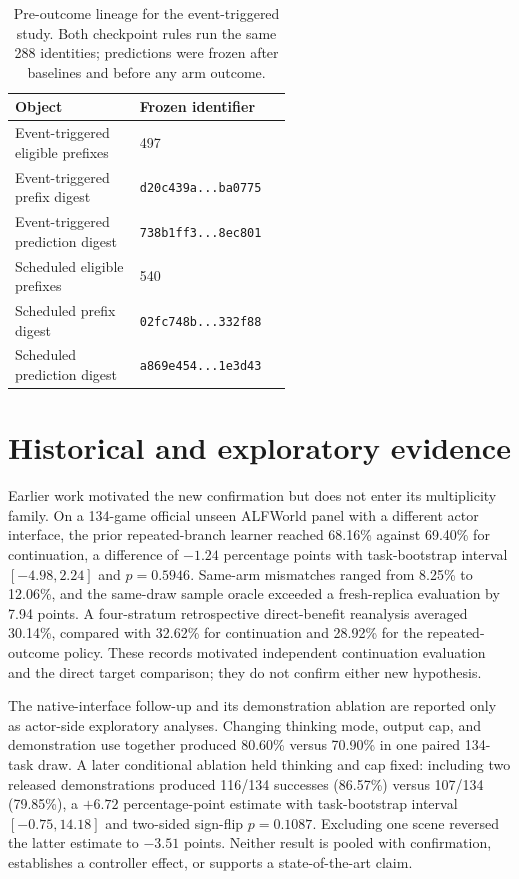 \begin{table}[ht]
\caption{Pre-outcome lineage for the event-triggered study. Both checkpoint rules run the same 288 identities; predictions were frozen after baselines and before any arm outcome.}
\label{tab:r2-lineage}
\centering
\small
\begin{tabular}{@{}lp{0.55\linewidth}@{}}
\toprule
Object & Frozen identifier \\
\midrule
Event-triggered eligible prefixes & 497 \\
Event-triggered prefix digest & \texttt{d20c439a...ba0775} \\
Event-triggered prediction digest & \texttt{738b1ff3...8ec801} \\
Scheduled eligible prefixes & 540 \\
Scheduled prefix digest & \texttt{02fc748b...332f88} \\
Scheduled prediction digest & \texttt{a869e454...1e3d43} \\
\bottomrule
\end{tabular}
\end{table}


\section{Historical and exploratory evidence}
\label{app:historical}

Earlier work motivated the new confirmation but does not enter its multiplicity family. On a 134-game official unseen ALFWorld panel with a different actor interface, the prior repeated-branch learner reached 68.16\% against 69.40\% for continuation, a difference of $-1.24$ percentage points with task-bootstrap interval $[-4.98,2.24]$ and $p=0.5946$. Same-arm mismatches ranged from 8.25\% to 12.06\%, and the same-draw sample oracle exceeded a fresh-replica evaluation by 7.94 points. A four-stratum retrospective direct-benefit reanalysis averaged 30.14\%, compared with 32.62\% for continuation and 28.92\% for the repeated-outcome policy. These records motivated independent continuation evaluation and the direct target comparison; they do not confirm either new hypothesis.

The native-interface follow-up and its demonstration ablation are reported only as actor-side exploratory analyses. Changing thinking mode, output cap, and demonstration use together produced 80.60\% versus 70.90\% in one paired 134-task draw. A later conditional ablation held thinking and cap fixed: including two released demonstrations produced 116/134 successes (86.57\%) versus 107/134 (79.85\%), a $+6.72$ percentage-point estimate with task-bootstrap interval $[-0.75,14.18]$ and two-sided sign-flip $p=0.1087$. Excluding one scene reversed the latter estimate to $-3.51$ points. Neither result is pooled with confirmation, establishes a controller effect, or supports a state-of-the-art claim.

